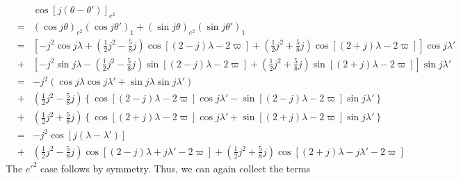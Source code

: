 \documentclass [12pt, a4paper] {article}
\begin{document}
\begin {eqnarray}
    &\:&\cos[j(\theta - \theta')]_{e^2} 
    \\\nonumber
    &=&
    (\cos j\theta)_{e^2}(\cos j\theta')_{1}
    +
    (\sin j\theta)_{e^2}(\sin j\theta')_{1}
    \\
    &=&
    \left[
        -
    j^2\cos j\lambda
    +
    \left(
        \frac{1}{2}j^2 - \frac{5}{8}j
    \right)
    \cos[(2 - j)\lambda - 2\varpi]
    +
    \left(
        \frac{1}{2}j^2 + \frac{5}{8}j
    \right)
    \cos[(2 + j)\lambda - 2\varpi]
    \right]
    \cos j\lambda'
    \quad\quad
    \\\nonumber 
    &+&
    \left[
    -j^2\sin j\lambda
    -
    \left(
        \frac{1}{2}j^2
        -
        \frac{5}{8}j
    \right)\sin[(2 - j)\lambda - 2\varpi]
    +
    \left(
        \frac{1}{2}j^2
        +
        \frac{5}{8}j
    \right)\sin[(2 + j)\lambda - 2\varpi]        
    \right]
    \sin j\lambda'
    \\
    &=&
    -j^2\left(
        \cos j\lambda\cos j\lambda' + \sin j\lambda\sin j\lambda'
    \right)
    \\\nonumber 
    &+&
    \left(\frac{1}{2}j^2 - \frac{5}{8}j\right)
    \left\{
        \cos[(2-j)\lambda - 2\varpi]\cos j\lambda'
        -
        \sin[(2-j)\lambda - 2\varpi]\sin j\lambda'
    \right\}
    \\\nonumber
    &+&
    \left(\frac{1}{2}j^2 + \frac{5}{8}j\right)
    \left\{
        \cos[(2+j)\lambda - 2\varpi]\cos j\lambda'
        +
        \sin[(2+j)\lambda - 2\varpi]\sin j\lambda'
    \right\}
    \\
    &=&
    -j^2\cos[j(\lambda - \lambda')]
    \\\nonumber 
    &+&
    \left(\frac{1}{2}j^2 - \frac{5}{8}j\right)\cos[(2-j)\lambda + j\lambda' - 2\varpi]
    +
    \left(\frac{1}{2}j^2 + \frac{5}{8}j\right)\cos[(2+j)\lambda - j\lambda' - 2\varpi]
\end {eqnarray}
The $e'^2$ case follows by symmetry. Thus, we can again collect the terms 
\end{document}
